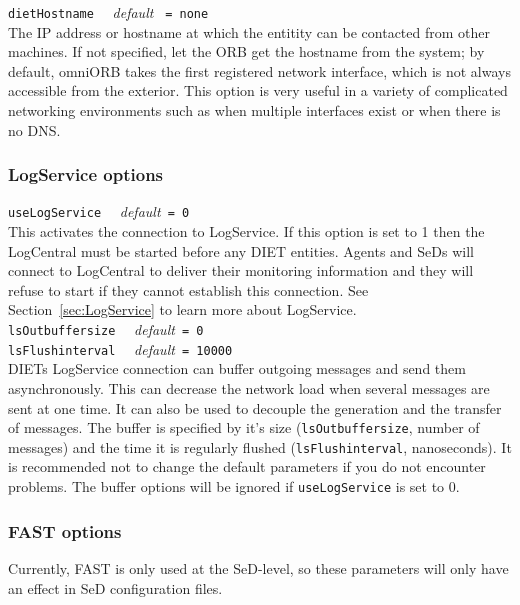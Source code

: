 \noindent
\texttt{dietHostname} \ \ \emph{default} \texttt{ = none }\\
The IP address or hostname at which the entitity can be contacted
from other machines. If not specified, let the
ORB get the hostname from the system; by default, omniORB takes the
first registered network interface, which is not always accessible
from the exterior.  This option is very useful in a variety of
complicated networking environments such as when multiple interfaces
exist or when there is no DNS.

\subsubsection{LogService options}

\noindent
\texttt{useLogService} \ \ \emph{default}\texttt{ = 0}\\ This
activates the connection to LogService. 
If
this option is set to 1 then the LogCentral must be started before any
DIET entities. Agents and SeDs will connect to LogCentral to deliver
their monitoring information and they will refuse to start if they
cannot establish this connection. See Section~\ref{sec:LogService} 
to learn more about LogService.\\

\noindent
\texttt{lsOutbuffersize} \ \ \emph{default}\texttt{ = 0}\\
\noindent
\texttt{lsFlushinterval} \ \ \emph{default}\texttt{ = 10000}\\ DIETs
LogService connection can buffer outgoing messages and send them
asynchronously. This can decrease the network load when
several messages are sent at one time. It can also be used to decouple
the generation and the transfer of messages.  The buffer is specified
by it's size (\texttt{lsOutbuffersize}, number of messages) and the
time it is regularly flushed (\texttt{lsFlushinterval},
nanoseconds). It is recommended not to change the default parameters
if you do not encounter problems. The buffer options will be ignored
if \texttt{useLogService} is set to 0.


\subsubsection{FAST options}

\noindent
Currently, FAST is only used at the SeD-level, so these parameters
will only have an effect in SeD configuration files.\\

